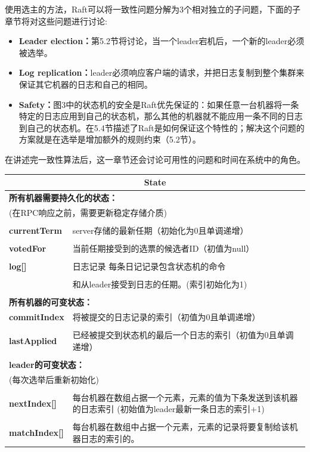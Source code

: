 \documentclass[journal]{IEEEtran}
\begin{document}
使用选主的方法，Raft可以将一致性问题分解为3个相对独立的子问题，下面的子章节将对这些问题进行讨论:

\begin{itemize}
\item \textbf{Leader election：}第5.2节将讨论，当一个leader宕机后，一个新的leader必须被选举。
\item \textbf{Log replication：}leader必须响应客户端的请求，并把日志复制到整个集群来保证其它机器的日志和自己的相同。
\item \textbf{Safety：}图3中的状态机的安全是Raft优先保证的：如果任意一台机器将一条特定的日志应用到自己的状态机，那么其他的机器就不能应用一条不同的日志到自己的状态机。在5.4节描述了Raft是如何保证这个特性的；解决这个问题的方案就是在选举是增加额外的规则约束（5.2节）。
\end{itemize}


在讲述完一致性算法后，这一章节还会讨论可用性的问题和时间在系统中的角色。

\begin{table}[htp]
\begin{center}
\begin{tabular}{|p{2cm}p{6cm}|}
\hline
\multicolumn{2}{|c|}{\textbf{State}}  \\
\hline
\multicolumn{2}{|l|}{\textbf{所有机器需要持久化的状态：}} \\
\multicolumn{2}{|l|}{(在RPC响应之前，需要更新稳定存储介质)} \\
&\\
\textbf{currentTerm} & server存储的最新任期（初始化为0且单调递增）\\
&\\
\textbf{votedFor} & 当前任期接受到的选票的候选者ID（初值为null）\\
&\\
\textbf{log[]} & 日志记录 每条日记记录包含状态机的命令 \\ 
&\\
 & 和从leader接受到日志的任期。(索引初始化为1) \\
&\\
\multicolumn{2}{|l|}{\textbf{所有机器的可变状态：}} \\
\textbf{commitIndex} & 将被提交的日志记录的索引（初值为0且单调递增）\\
&\\
\textbf{lastApplied} & 已经被提交到状态机的最后一个日志的索引（初值为0且单调递增）\\
&\\
\multicolumn{2}{|l|}{\textbf{leader的可变状态：}} \\
\multicolumn{2}{|l|}{(每次选举后重新初始化)} \\
&\\
\textbf{nextIndex[]} & 每台机器在数组占据一个元素，元素的值为下条发送到该机器的日志索引 (初始值为leader最新一条日志的索引+1)\\
&\\
\textbf{matchIndex[]} & 每台机器在数组中占据一个元素，元素的记录将要复制给该机器日志的索引的。\\
\hline
\end{tabular}
\end{center}
\label{default}
\end{table}%
\end{document}

